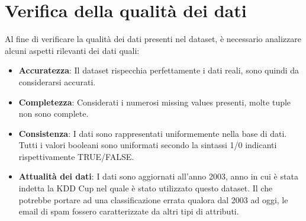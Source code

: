 \section{Verifica della qualità dei dati}
Al fine di verificare la qualità dei dati presenti nel dataset, è necessario analizzare alcuni aspetti rilevanti dei dati quali:
\begin{itemize}
	\item \textbf{Accuratezza}: Il dataset rispecchia perfettamente i dati reali, sono quindi da considerarsi accurati.
	\item \textbf{Completezza}: Considerati i numerosi missing values presenti, molte tuple non sono complete.
	\item \textbf{Consistenza}: I dati sono rappresentati uniformemente nella base di dati. Tutti i valori booleani sono uniformati secondo la sintassi 1/0 indicanti rispettivamente TRUE/FALSE.
	\item \textbf{Attualità dei dati}: I dati sono aggiornati all'anno 2003, anno in cui è stata indetta la KDD Cup nel quale è stato utilizzato questo dataset. Il che potrebbe portare ad una classificazione errata qualora dal 2003 ad oggi, le email di spam fossero caratterizzate da altri tipi di attributi.
\end{itemize}
%
%
%
